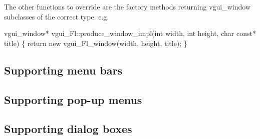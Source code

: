 \documentclass[12pt]{report} \usepackage{epsfig}
\begin{document}
The other functions to override are the factory methods returning vgui\_window subclasses
of the correct type. e.g.

{\scriptsize
\begin{verbawf} 
  vgui\_window* vgui\_Fl::produce\_window\_impl(int width, int height, char const* title) 
  \{
    return new vgui\_Fl\_window(width, height, title);
  \}
\end{verbawf}
}

\subsection{Supporting menu bars}

\subsection{Supporting pop-up menus}

\subsection{Supporting dialog boxes}
\end{document}
